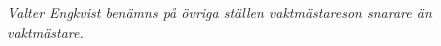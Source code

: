 \vspace{5mm}
\textit{
Valter Engkvist benämns på övriga ställen \guillemotright{}vaktmästareson\guillemotright{}
snarare än \guillemotright{}vaktmästare\guillemotright{}.
}